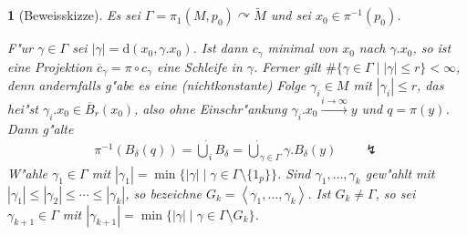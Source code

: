 \documentclass[paper=A4, twoside, chapterprefix=true, bibliography=totoc, headsepline]{scrbook}
\newcommand{\tikzgitter}[3][0.25]{
	\draw[step=#1,gray!15] #2 grid #3;
	\draw[step=2*#1,gray!30] #2 grid #3;
	\fill (0,0) circle(0.1); 
}
\newcommand{\tikztorus}[2][1]{
	\draw[] #2  ellipse (#1*2 and #1*1);
	
	\begin{scope}
		\clip ($#2 - #1*(1, 0.5)$) rectangle ($#2 + #1*(1, 1)$);
		\path[draw,name path=gkreis] ($#2 + #1*(0,0.75)$) ellipse (#1*1.25 and #1*1);
	\end{scope}
	\path[name path=kkreis] ($#2 - #1*(0,0.5)$) ellipse (#1*1 and #1*0.75);
	\path[name intersections={of=gkreis and kkreis}];
	\begin{scope}
		\clip (intersection-1) rectangle ($(intersection-2)+(0,0.5)$);
		\draw ($#2 - #1*(0,0.5)$) ellipse (#1*1 and #1*0.75);
	\end{scope}
	
	\def\torusbreite{#1*2}
	\def\torushoehe{#1*1}
	\def\torusdicke{#1*0.75}
	\coordinate (torusUntenLoch) at ($#2 - #1*(0,0.25)$);
	\coordinate (torusUnten) at ($#2 - #1*(0,1)$);
}
\newcommand{\dop}{\mathrm{d}}
\theoremstyle{plain}
\theoremstyle{nonumberplain}
\theoremstyle{empty}
\newtheorem{emptythm}{}%
\theoremstyle{break}
\begin{document}
\begin{emptythm}[Beweisskizze]
Es sei $\Gamma = \pi_1(M,p_0) \curvearrowright \tilde M$ und sei $x_0 \in \pi^{-1}(p_0)$.
\begin{center}\end{center}
F"ur $\gamma \in \Gamma$ sei $|\gamma| = \dop(x_0, \gamma . x_0)$.
Ist dann $c_{\gamma}$ minimal von $x_0$ nach $\gamma . x_0$, so ist eine Projektion $\overline c_{\gamma} = \pi \circ c_{\gamma}$ eine Schleife in $\gamma$.
Ferner gilt $\#\{\gamma \in \Gamma \mid | \gamma | \leq r \} < \infty$, denn andernfalls g"abe es eine (nichtkonstante) Folge $\gamma_i \in M$ mit $|\gamma_i| \leq r$, das hei"st $\gamma_i . x_0 \in \overline B_r(x_0)$, also ohne Einschr"ankung $\gamma_i . x_0 \xrightarrow{i \to \infty} y$ und $q = \pi(y)$. Dann g"alte
\begin{align*}
	\pi^{-1}(B_{\delta}(q)) = \dot \bigcup_{i} B_{\delta} = \dot \bigcup_{\gamma \in \Gamma} \gamma . B_{\delta}(y) \qquad \lightning
\end{align*}
W"ahle $\gamma_1 \in \Gamma$ mit $|\gamma_1| = \min \{ |\gamma| \mid \gamma \in \Gamma \setminus \{1_p\} \}$.
Sind $\gamma_1, \ldots, \gamma_k$ gew"ahlt mit $|\gamma_1| \leq |\gamma_2| \leq \cdots \leq |\gamma_k|$, so bezeichne $G_k = \left< \gamma_1, \ldots, \gamma_k\right>$.
Ist $G_k \neq \Gamma$, so sei $\gamma_{k+1} \in \Gamma$ mit $|\gamma_{k+1}| = \min \{ |\gamma| \mid \gamma \in \Gamma \setminus G_k\}$.


\end{emptythm}
\end{document}
